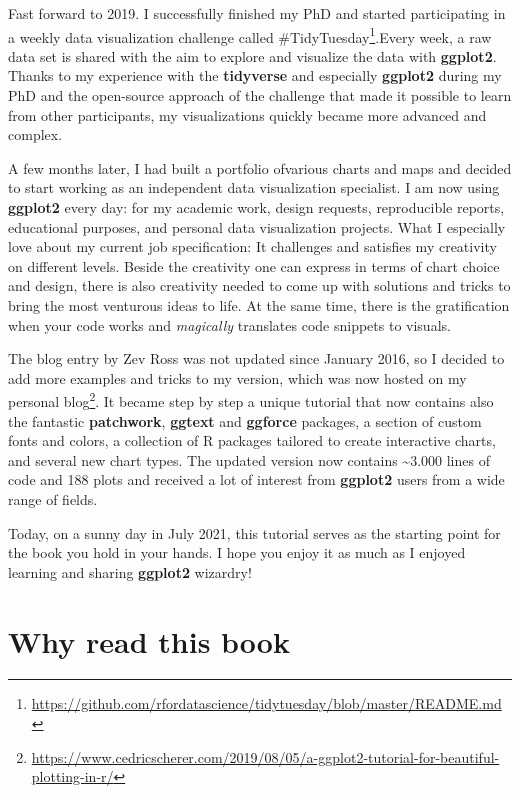 \documentclass[
]{krantz}
\renewcommand{\href}[2]{#2\footnote{\url{#1}}}
\begin{document}
Fast forward to 2019. I successfully finished my PhD and started participating in a weekly data visualization challenge called \href{https://github.com/rfordatascience/tidytuesday/blob/master/README.md}{\#TidyTuesday}.Every week, a raw data set is shared with the aim to explore and visualize the data with \textbf{ggplot2}. Thanks to my experience with the \textbf{tidyverse} and especially \textbf{ggplot2} during my PhD and the open-source approach of the challenge that made it possible to learn from other participants, my visualizations quickly became more advanced and complex.

A few months later, I had built a portfolio ofvarious charts and maps and decided to start working as an independent data visualization specialist. I am now using \textbf{ggplot2} every day: for my academic work, design requests, reproducible reports, educational purposes, and personal data visualization projects. What I especially love about my current job specification: It challenges and satisfies my creativity on different levels. Beside the creativity one can express in terms of chart choice and design, there is also creativity needed to come up with solutions and tricks to bring the most venturous ideas to life. At the same time, there is the gratification when your code works and \emph{magically} translates code snippets to visuals.

The blog entry by Zev Ross was not updated since January 2016, so I decided to add more examples and tricks to my version, which was now hosted on my \href{https://www.cedricscherer.com/2019/08/05/a-ggplot2-tutorial-for-beautiful-plotting-in-r/}{personal blog}. It became step by step a unique tutorial that now contains also the fantastic \textbf{patchwork}, \textbf{ggtext} and \textbf{ggforce} packages, a section of custom fonts and colors, a collection of R packages tailored to create interactive charts, and several new chart types. The updated version now contains \textasciitilde3.000 lines of code and 188 plots and received a lot of interest from \textbf{ggplot2} users from a wide range of fields.

Today, on a sunny day in July 2021, this tutorial serves as the starting point for the book you hold in your hands. I hope you enjoy it as much as I enjoyed learning and sharing \textbf{ggplot2} wizardry!

\hypertarget{why-read-this-book}{%
\section*{Why read this book}\label{why-read-this-book}}
\end{document}
